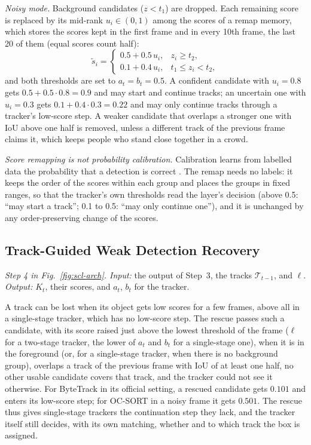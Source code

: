 \emph{Noisy mode.} Background candidates ($z<t_1$) are dropped. Each remaining score is replaced by its mid-rank $u_i\in(0,1)$ among the scores of a remap memory, which stores the scores kept in the first frame and in every 10th frame, the last 20 of them (equal scores count half):
\begin{equation}
\tilde{s}_i=
\begin{cases}
0.5+0.5\,u_i, & z_i\ge t_2,\\
0.1+0.4\,u_i, & t_1\le z_i<t_2,
\end{cases}
\label{eq:scl-remap}
\end{equation}
and both thresholds are set to $a_t=b_t=0.5$. A confident candidate with $u_i=0.8$ gets $0.5+0.5\cdot0.8=0.9$ and may start and continue tracks; an uncertain one with $u_i=0.3$ gets $0.1+0.4\cdot0.3=0.22$ and may only continue tracks through a tracker's low-score step. A weaker candidate that overlaps a stronger one with IoU above one half is removed, unless a different track of the previous frame claims it, which keeps people who stand close together in a crowd.

\emph{Score remapping is not probability calibration.} Calibration learns from labelled data the probability that a detection is correct \cite{kuppers2020detcalib}. The remap needs no labels: it keeps the order of the scores within each group and places the groups in fixed ranges, so that the tracker's own thresholds read the layer's decision (above 0.5: ``may start a track''; 0.1 to 0.5: ``may only continue one''), and it is unchanged by any order-preserving change of the scores.

\subsection{Track-Guided Weak Detection Recovery}\label{sec:scl-rescue}
\emph{Step 4 in Fig.~\ref{fig:scl-arch}. Input:} the output of Step~3, the tracks $\mathcal{T}_{t-1}$, and $\ell$. \emph{Output:} $K_t$, their scores, and $a_t$, $b_t$ for the tracker.

A track can be lost when its object gets low scores for a few frames, above all in a single-stage tracker, which has no low-score step. The rescue passes such a candidate, with its score raised just above the lowest threshold of the frame ($\ell$ for a two-stage tracker, the lower of $a_t$ and $b_t$ for a single-stage one), when it is in the foreground (or, for a single-stage tracker, when there is no background group), overlaps a track of the previous frame with IoU of at least one half, no other usable candidate covers that track, and the tracker could not see it otherwise. For ByteTrack in its official setting, a rescued candidate gets $0.101$ and enters its low-score step; for OC-SORT in a noisy frame it gets $0.501$. The rescue thus gives single-stage trackers the continuation step they lack, and the tracker itself still decides, with its own matching, whether and to which track the box is assigned.

